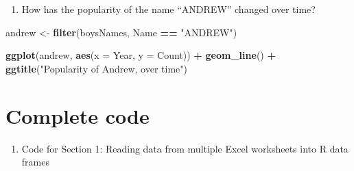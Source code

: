 \documentclass[
]{book}
\newenvironment{Shaded}{\begin{snugshade}}{\end{snugshade}}
\newcommand{\ControlFlowTok}[1]{\textcolor[rgb]{0.13,0.29,0.53}{\textbf{#1}}}
\newcommand{\DataTypeTok}[1]{\textcolor[rgb]{0.13,0.29,0.53}{#1}}
\newcommand{\DecValTok}[1]{\textcolor[rgb]{0.00,0.00,0.81}{#1}}
\newcommand{\KeywordTok}[1]{\textcolor[rgb]{0.13,0.29,0.53}{\textbf{#1}}}
\newcommand{\NormalTok}[1]{#1}
\newcommand{\OperatorTok}[1]{\textcolor[rgb]{0.81,0.36,0.00}{\textbf{#1}}}
\newcommand{\OtherTok}[1]{\textcolor[rgb]{0.56,0.35,0.01}{#1}}
\newcommand{\StringTok}[1]{\textcolor[rgb]{0.31,0.60,0.02}{#1}}
\providecommand{\tightlist}{%
  \setlength{\itemsep}{0pt}\setlength{\parskip}{0pt}}
\begin{document}
\begin{enumerate}
\def\labelenumi{\arabic{enumi}.}
\setcounter{enumi}{3}
\tightlist
\item
  How has the popularity of the name ``ANDREW'' changed over time?
\end{enumerate}

\begin{Shaded}
\begin{Highlighting}[]
\NormalTok{andrew <-}\StringTok{ }\KeywordTok{filter}\NormalTok{(boysNames, Name }\OperatorTok{==}\StringTok{ "ANDREW"}\NormalTok{)}

\KeywordTok{ggplot}\NormalTok{(andrew, }\KeywordTok{aes}\NormalTok{(}\DataTypeTok{x =}\NormalTok{ Year, }\DataTypeTok{y =}\NormalTok{ Count)) }\OperatorTok{+}
\StringTok{    }\KeywordTok{geom_line}\NormalTok{() }\OperatorTok{+}
\StringTok{    }\KeywordTok{ggtitle}\NormalTok{(}\StringTok{"Popularity of Andrew, over time"}\NormalTok{)}
\end{Highlighting}
\end{Shaded}

\hypertarget{complete-code}{%
\section{Complete code}\label{complete-code}}

\begin{enumerate}
\def\labelenumi{\arabic{enumi}.}
\tightlist
\item
  Code for Section 1: Reading data from multiple Excel worksheets into R data frames
\end{enumerate}

\begin{Shaded}
\end{Shaded}
\end{document}
